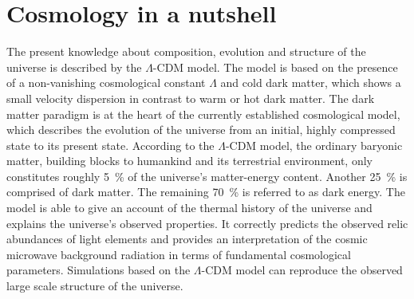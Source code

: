 \section{Cosmology in a nutshell}
\label{sec:dm:cosmology}
The present knowledge about composition, evolution and structure of the universe is described by the \(\Lambda\)-CDM model. The model is based on the presence of a non-vanishing cosmological constant \(\Lambda\) and cold dark matter, which shows a small velocity dispersion in contrast to warm or hot dark matter. The dark matter paradigm is at the heart of the currently established cosmological model, which describes the evolution of the universe from an initial, highly compressed state to its present state.
According to the \(\Lambda\)-CDM model, the ordinary baryonic matter, building blocks to humankind and its terrestrial environment, only constitutes roughly \SI{5}{\percent} of the universe's matter-energy content. Another \SI{25}{\percent} is comprised of dark matter. The remaining \SI{70}{\percent} is referred to as dark energy.
The model is able to give an account of the thermal history of the universe and explains the universe's observed properties. It correctly predicts the observed relic abundances of light elements and provides an interpretation of the cosmic microwave background radiation in terms of fundamental cosmological parameters. Simulations based on the \(\Lambda\)-CDM model can reproduce the observed large scale structure of the universe.

